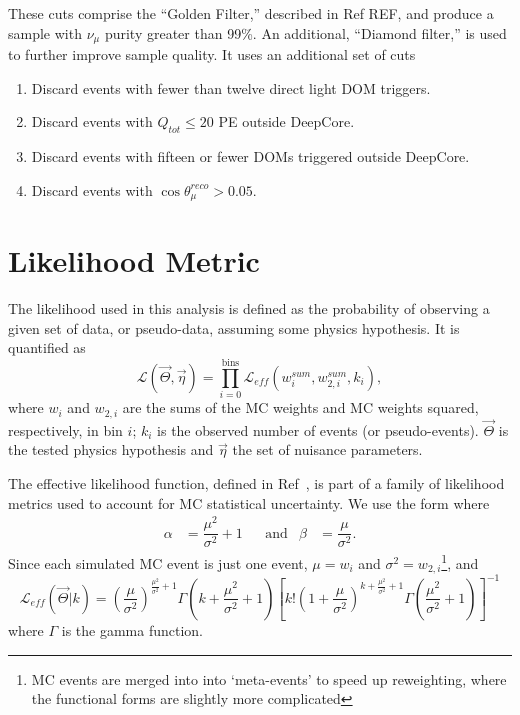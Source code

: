 \documentclass[main.tex]{subfiles}
\begin{document}
These cuts comprise the ``Golden Filter,'' described in Ref REF, and produce a sample with $\nu_{\mu}$ purity greater than 99\%. %
An additional, ``Diamond filter,'' is used to further improve sample quality. 
It uses an additional set of cuts
\begin{enumerate}
    \item Discard events with fewer than twelve direct light DOM triggers. 
    \item Discard events with $Q_{tot}\leq20$ PE outside DeepCore. 
    \item Discard events with fifteen or fewer DOMs triggered outside DeepCore. 
    \item Discard events with $\cos\theta_{\mu}^{reco}>0.05$.
\end{enumerate}

\section{Likelihood Metric}\label{sect:llh_metric}

The likelihood used in this analysis is defined as the probability of observing a given set of data, or pseudo-data, assuming some physics hypothesis.
It is quantified as 
\begin{equation}
    \mathcal{L}(\vec{\Theta}, \vec{\eta}) = \prod_{i=0}^{\text{bins}} \mathcal{L}_{eff}\left( w_{i}^{sum}, w_{2,i}^{sum}, k_{i} \right),
\end{equation}
where $w_{i}$ and $w_{2,i}$ are the sums of the MC weights and MC weights squared, respectively, in bin $i$; $k_{i}$ is the observed number of events (or pseudo-events). 
$\vec{\Theta}$ is the tested physics hypothesis and $\vec{\eta}$ the set of nuisance parameters. 

The effective likelihood function, defined in Ref~\cite{effective_llh}, is part of a family of likelihood metrics used to account for MC statistical uncertainty. 
We use the form where
\begin{align}
    \alpha&=\dfrac{\mu^{2}}{\sigma^{2}} +1 & &\text{and} & \beta&=\dfrac{\mu}{\sigma^{2}}.
\end{align}
Since each simulated MC event is just one event, $\mu = w_{i}$ and $\sigma^{2} = w_{2,i}$\footnote{MC events are merged into into `meta-events' to speed up reweighting, where the functional forms are slightly more complicated}, and
\begin{equation}
    \mathcal{L}_{eff}(\vec{\Theta} | k) = \left(\dfrac{\mu}{\sigma^{2}}\right)^{\tfrac{\mu^{2}}{\sigma^{2}} + 1} \Gamma\left(k + \dfrac{\mu^{2}}{\sigma^{2}} + 1\right) \left[ k! \left(1+\dfrac{\mu}{\sigma^{2}}\right)^{k+\tfrac{\mu^{2}}{\sigma^{2}} + 1} \Gamma\left(\dfrac{\mu^{2}}{\sigma^{2}} +1\right)\right]^{-1}
\end{equation}
where $\Gamma$ is the gamma function. 
\end{document}
